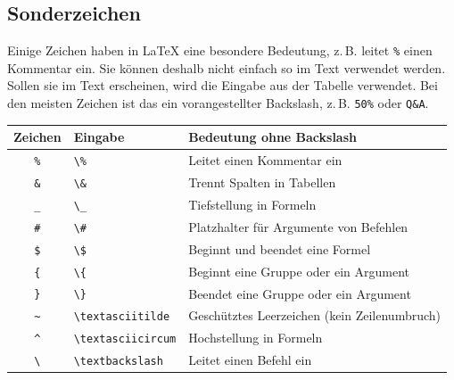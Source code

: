 \subsection{Sonderzeichen}
\label{latex-sonderzeichen}
Einige Zeichen haben in \LaTeX{} eine besondere Bedeutung, z.\,B. leitet \texttt{\%} einen Kommentar ein. Sie können deshalb nicht einfach so im Text verwendet werden. Sollen sie im Text erscheinen, wird die Eingabe aus der Tabelle verwendet. Bei den meisten Zeichen ist das ein vorangestellter Backslash, z.\,B. \texttt{50\%} oder \texttt{Q\&A}.

\begin{center}
	\begin{tabularx}{\linewidth}{clX}
		\toprule
		\textbf{Zeichen} & \textbf{Eingabe}            & \textbf{Bedeutung ohne Backslash}        \\
		\midrule
		\texttt{\%}      & \texttt{\textbackslash\%}   & Leitet einen Kommentar ein               \\
		\texttt{\&}      & \texttt{\textbackslash\&}   & Trennt Spalten in Tabellen               \\
		\texttt{\_}      & \texttt{\textbackslash\_}   & Tiefstellung in Formeln                  \\
		\texttt{\#}      & \texttt{\textbackslash\#}   & Platzhalter für Argumente von Befehlen   \\
		\texttt{\$}      & \texttt{\textbackslash\$}   & Beginnt und beendet eine Formel          \\
		\texttt{\{}      & \texttt{\textbackslash\{}   & Beginnt eine Gruppe oder ein Argument    \\
		\texttt{\}}      & \texttt{\textbackslash\}}   & Beendet eine Gruppe oder ein Argument    \\
		\texttt{\textasciitilde} & \texttt{\textbackslash textasciitilde} & Geschütztes Leerzeichen (kein Zeilenumbruch) \\
		\texttt{\textasciicircum} & \texttt{\textbackslash textasciicircum} & Hochstellung in Formeln \\
		\texttt{\textbackslash} & \texttt{\textbackslash textbackslash} & Leitet einen Befehl ein \\
		\bottomrule
	\end{tabularx}
\end{center}
